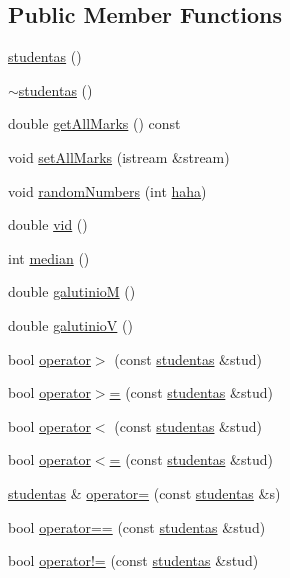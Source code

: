 \subsection*{Public Member Functions}
\begin{DoxyCompactItemize}
\item 
\mbox{\hyperlink{classstudentas_a40a99ea5d527a3d443123f4785550787}{studentas}} ()
\item 
\mbox{\hyperlink{classstudentas_a74b639e1a2ffe282686999b931eb4aaa}{$\sim$studentas}} ()
\item 
double \mbox{\hyperlink{classstudentas_a8d73db48fa2c8dd1af53d22c2b8a8e6b}{get\+All\+Marks}} () const
\item 
void \mbox{\hyperlink{classstudentas_aa84c5ceb42f101eba098ced1da6697eb}{set\+All\+Marks}} (istream \&stream)
\item 
void \mbox{\hyperlink{classstudentas_add8a91eab225ddd2baeae0764bfd5d82}{random\+Numbers}} (int \mbox{\hyperlink{classstudentas_af3d5908e76c35d49ffca65ac4d62665c}{haha}})
\item 
double \mbox{\hyperlink{classstudentas_a32033bea498f5adc3c4dc381678da812}{vid}} ()
\item 
int \mbox{\hyperlink{classstudentas_a1b61aa2891c94971b67538447f2d1703}{median}} ()
\item 
double \mbox{\hyperlink{classstudentas_a8827137aded5c2a86cc3385125df4583}{galutinioM}} ()
\item 
double \mbox{\hyperlink{classstudentas_a1d69bccf536a7f5f15e3f347f70cc4c2}{galutinioV}} ()
\item 
bool \mbox{\hyperlink{classstudentas_a1ce1563364b0b88512c2dc793ac688bf}{operator$>$}} (const \mbox{\hyperlink{classstudentas}{studentas}} \&stud)
\item 
bool \mbox{\hyperlink{classstudentas_a4112fca61c65de68011b8abb6a5aaa54}{operator$>$=}} (const \mbox{\hyperlink{classstudentas}{studentas}} \&stud)
\item 
bool \mbox{\hyperlink{classstudentas_aa8a828dbfbed06fc78e5fa75c839949f}{operator$<$}} (const \mbox{\hyperlink{classstudentas}{studentas}} \&stud)
\item 
bool \mbox{\hyperlink{classstudentas_aa63f3fbfc3c16bf9e243bee4d4ec804a}{operator$<$=}} (const \mbox{\hyperlink{classstudentas}{studentas}} \&stud)
\item 
\mbox{\hyperlink{classstudentas}{studentas}} \& \mbox{\hyperlink{classstudentas_ab34876d457c27eafac70ee5a416595cf}{operator=}} (const \mbox{\hyperlink{classstudentas}{studentas}} \&s)
\item 
bool \mbox{\hyperlink{classstudentas_a7d6128edc9139ee3ae15b9aad30e9a1b}{operator==}} (const \mbox{\hyperlink{classstudentas}{studentas}} \&stud)
\item 
bool \mbox{\hyperlink{classstudentas_a421eb39919e6519907b8886bd6f26a7f}{operator!=}} (const \mbox{\hyperlink{classstudentas}{studentas}} \&stud)
\end{DoxyCompactItemize}
